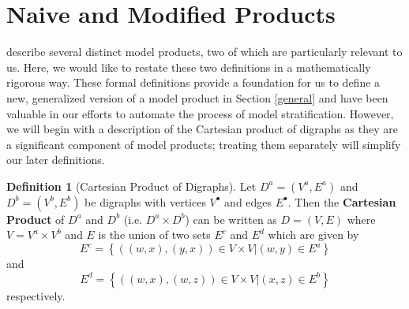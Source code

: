 \documentclass[pdflatex,sn-basic]{sn-jnl}%
\theoremstyle{definition}
\newtheorem{definition}{Definition}
\begin{document}
\section{Naive and Modified Products}\label{worden}

\cite{worden2017products} describe several distinct model products, two of which are particularly relevant to us. Here, we would like to restate these two definitions in a mathematically rigorous way. These formal definitions provide a foundation for us to define a new, generalized version of a model product in Section \ref{general} and have been valuable in our efforts to automate the process of model stratification. However, we will begin with a description of the Cartesian product of digraphs as they are a significant component of model products; treating them separately will simplify our later definitions.

\begin{definition}[Cartesian Product of Digraphs]\label{cpd}
    Let $D^a = (V^a, E^a)$ and $D^b = (V^b, E^b)$ be digraphs with vertices $V^{\bullet}$ and edges $E^{\bullet}$. Then the \textbf{Cartesian Product} of $D^a$ and $D^b$ (i.e. $D^a\times D^b$) can be written as $D=(V, E)$ where $V=V^a\times V^b$ and $E$ is the union of two sets $E^c$ and $E^d$ which are given by
    \begin{equation}
        E^c = \left\{((w,x),(y,x))\in V\times V \vert (w,y)\in E^a\right\}
    \end{equation}
    and
    \begin{equation}
        E^d = \left\{((w,x),(w,z))\in V\times V \vert (x,z)\in E^b \right\}
    \end{equation}
    respectively.
\end{definition}
\end{document}
